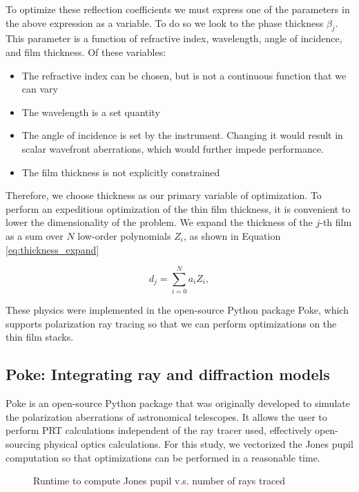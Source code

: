 To optimize these reflection coefficients we must express one of the parameters in the above expression as a variable. To do so we look to the phase thickness $\beta_{j}$. This parameter is a function of refractive index, wavelength, angle of incidence, and film thickness. Of these variables:
\begin{itemize}
	\item The refractive index can be chosen, but is not a continuous function that we can vary
	\item The wavelength is a set quantity
	\item The angle of incidence is set by the instrument. Changing it would result in scalar wavefront aberrations, which would further impede performance.
	\item The film thickness is not explicitly constrained
\end{itemize}

Therefore, we choose thickness as our primary variable of optimization. To perform an expeditious optimization of the thin film thickness, it is convenient to lower the dimensionality of the problem. We expand the thickness of the $j$-th film as a sum over $N$ low-order polynomials $Z_{i}$, as shown in Equation \ref{eq:thickness_expand}

\begin{equation}
	d_{j} = \sum_{i = 0}^{N} a_{i} Z_{i},
	\label{eq:thickness_expand}
\end{equation}

These physics were implemented in the open-source Python package Poke, which supports polarization ray tracing so that we can perform optimizations on the thin film stacks.

\subsection{Poke: Integrating ray and diffraction models}
Poke is an open-source Python package that was originally developed to simulate the polarization aberrations of astronomical telescopes\cite{anche_gsmts}. It allows the user to perform PRT calculations independent of the ray tracer used, effectively open-sourcing physical optics calculations. For this study, we vectorized the Jones pupil computation so that optimizations can be performed in a reasonable time.

\begin{figure}
    \centering
    \caption{Runtime to compute Jones pupil v.s. number of rays traced}
    \label{fig:my_label}
\end{figure}

